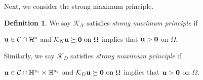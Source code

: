 \documentclass[a4paper,11pt]{amsart}
\newtheorem{theorem}{Theorem}
\newtheorem{proposition}[theorem]{Proposition}
\theoremstyle{definition}
\newtheorem{definition}[theorem]{Definition}
\def\O{\Omega}
\numberwithin{equation}{section}
\theoremstyle{definition}
\def\O{\Omega}
\begin{document}
%












%




Next, we consider the strong maximum principle.

\begin{definition}
We say $\mathcal{K}_N$ satisfies {\it strong maximum principle} if
\begin{center}
${\bf u}\in \mathcal{C}\cap \mathcal{H}^{\bf s}$ and $ \mathcal{K}_N{\bf u}\succeq {\bf 0} \text{ on }\O$ implies that ${\bf u}> {\bf 0}$ on $\overline{\O}$.
\end{center}
Similarly, we say $\mathcal{K}_D$ satisfies {\it strong maximum principle} if
\begin{center}
${\bf u}\in \mathcal{C}\cap \mathbb{H}^{s_1}\times \mathbb{H}^{s_2}$ and $ \mathcal{K}_D{\bf u}\succeq {\bf 0} \text{ on }\O$ implies that ${\bf u}> {\bf 0}$ on $\O$.
\end{center}

\end{definition}
\end{document}
